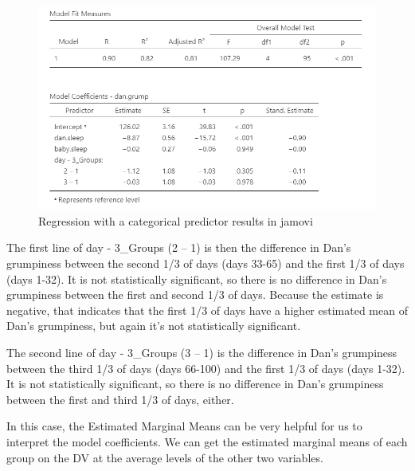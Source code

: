 \documentclass[
]{book}
\begin{document}
\begin{figure}

{\centering \includegraphics[width=1\linewidth]{images/13-regression/regression-categorical} 

}

\caption{Regression with a categorical predictor results in jamovi}\label{fig:unnamed-chunk-15}
\end{figure}

The first line of day - 3\_Groups (2 -- 1) is then the difference in Dan's grumpiness between the second 1/3 of days (days 33-65) and the first 1/3 of days (days 1-32). It is not statistically significant, so there is no difference in Dan's grumpiness between the first and second 1/3 of days. Because the estimate is negative, that indicates that the first 1/3 of days have a higher estimated mean of Dan's grumpiness, but again it's not statistically significant.

The second line of day - 3\_Groups (3 -- 1) is the difference in Dan's grumpiness between the third 1/3 of days (days 66-100) and the first 1/3 of days (days 1-32). It is not statistically significant, so there is no difference in Dan's grumpiness between the first and third 1/3 of days, either.

In this case, the Estimated Marginal Means can be very helpful for us to interpret the model coefficients. We can get the estimated marginal means of each group on the DV at the average levels of the other two variables.
\end{document}
